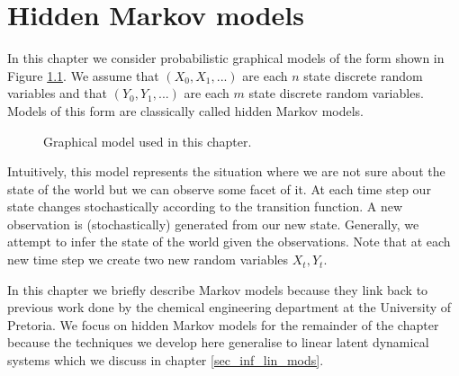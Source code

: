 \chapter{Hidden Markov models}
\label{sec_hmm}
In this chapter we consider probabilistic graphical models of the form shown in Figure \ref{fig_linmod}. We assume that  $(X_0, X_1,...)$ are each $n$ state discrete random variables and that $(Y_0, Y_1,...)$ are each $m$ state discrete random variables. Models of this form are classically called hidden Markov models.
\begin{figure}[H] 
\centering
{}
\caption{Graphical model used in this chapter.}
\label{fig_linmod}
\end{figure}
Intuitively, this model represents the situation where we are not sure about the state of the world but we can observe some facet of it. At each time step our state changes stochastically according to the transition function. A new observation is (stochastically) generated from our new state. Generally, we attempt to infer the state of the world given the observations. Note that at each new time step we create two new random variables $X_t, Y_t$.

In this chapter we briefly describe Markov models because they link back to previous work done by the chemical engineering department at the University of Pretoria. We focus on hidden Markov models for the remainder of the chapter because the techniques we develop here generalise to linear latent dynamical systems which we discuss in chapter \ref{sec_inf_lin_mods}. 

